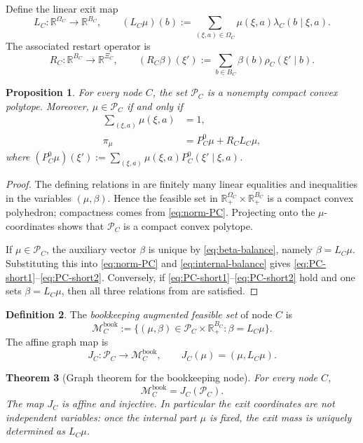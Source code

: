 \documentclass[12pt]{article}
\newtheorem{theorem}{Theorem}[section]
\newtheorem{proposition}[theorem]{Proposition}
\theoremstyle{definition}
\newtheorem{definition}[theorem]{Definition}
\newcommand{\R}{\mathbb{R}}
\newcommand{\1}{\mathbf{1}}
\newcommand{\cM}{\mathcal{M}}
\newcommand{\cP}{\mathcal{P}}
\begin{document}
Define the linear exit map
\begin{equation}
\label{eq:LC-def}
L_C:\R^{\Omega_C}\to \R^{B_C},
\qquad
(L_C\mu)(b):=
\sum_{(\xi,a)\in\Omega_C}\mu(\xi,a)\lambda_C(b\mid\xi,a).
\end{equation}
The associated restart operator is
\begin{equation}
\label{eq:RC-def}
R_C:\R^{B_C}\to \R^{\Xi_C},
\qquad
(R_C\beta)(\xi'):=\sum_{b\in B_C}\beta(b)\rho_C(\xi'\mid b).
\end{equation}


\begin{proposition}
\label{prop:PC-polytope}
For every node $C$, the set $\cP_C$ is a nonempty compact convex polytope.
Moreover, $\mu\in\cP_C$ if and only if
\begin{align}
\sum_{(\xi,a)}\mu(\xi,a)&=1,
\label{eq:PC-short1}
\\
\pi_\mu &= P_C^0\mu + R_C L_C\mu,
\label{eq:PC-short2}
\end{align}
where $(P_C^0\mu)(\xi'):=\sum_{(\xi,a)}\mu(\xi,a)P_C^0(\xi'\mid\xi,a)$.
\end{proposition}

\begin{proof}
The defining relations in  are finitely many linear equalities and
inequalities in the variables $(\mu,\beta)$. Hence the feasible set in
$\R_+^{\Omega_C}\times\R_+^{B_C}$ is a compact convex polyhedron; compactness
comes from \eqref{eq:norm-PC}. Projecting onto the $\mu$-coordinates shows that
$\cP_C$ is a compact convex polytope.

If $\mu\in\cP_C$, the auxiliary vector $\beta$ is unique by
\eqref{eq:beta-balance}, namely $\beta=L_C\mu$. Substituting this into
\eqref{eq:norm-PC} and \eqref{eq:internal-balance} gives
\eqref{eq:PC-short1}--\eqref{eq:PC-short2}. Conversely, if
\eqref{eq:PC-short1}--\eqref{eq:PC-short2} hold and one sets $\beta=L_C\mu$, then
all three relations from  are satisfied.
\end{proof}


\begin{definition}
\label{def:MCbook}
The \emph{bookkeeping augmented feasible set} of node $C$ is
\[
\cM_C^{\mathrm{book}}
:=
\{(\mu,\beta)\in\cP_C\times\R_+^{B_C}:\beta=L_C\mu\}.
\]
The affine graph map is
\[
J_C:\cP_C\to \cM_C^{\mathrm{book}},
\qquad J_C(\mu)=(\mu,L_C\mu).
\]
\end{definition}

\begin{theorem}[Graph theorem for the bookkeeping node]
\label{thm:graph-theorem}
For every node $C$,
\[
\cM_C^{\mathrm{book}} = J_C(\cP_C).
\]
The map $J_C$ is affine and injective. In particular the exit coordinates are not
independent variables: once the internal part $\mu$ is fixed, the exit mass is
uniquely determined as $L_C\mu$.
\end{theorem}
\end{document}
